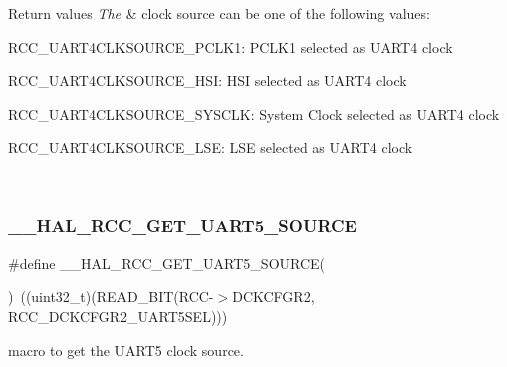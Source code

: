 \begin{DoxyRetVals}{Return values}
{\em The} & clock source can be one of the following values\+: \begin{DoxyItemize}
\item R\+C\+C\+\_\+\+U\+A\+R\+T4\+C\+L\+K\+S\+O\+U\+R\+C\+E\+\_\+\+P\+C\+L\+K1\+: P\+C\+L\+K1 selected as U\+A\+R\+T4 clock \item R\+C\+C\+\_\+\+U\+A\+R\+T4\+C\+L\+K\+S\+O\+U\+R\+C\+E\+\_\+\+H\+SI\+: H\+SI selected as U\+A\+R\+T4 clock \item R\+C\+C\+\_\+\+U\+A\+R\+T4\+C\+L\+K\+S\+O\+U\+R\+C\+E\+\_\+\+S\+Y\+S\+C\+LK\+: System Clock selected as U\+A\+R\+T4 clock \item R\+C\+C\+\_\+\+U\+A\+R\+T4\+C\+L\+K\+S\+O\+U\+R\+C\+E\+\_\+\+L\+SE\+: L\+SE selected as U\+A\+R\+T4 clock \end{DoxyItemize}
\\
\hline
\end{DoxyRetVals}
\mbox{\label{group___r_c_c_ex___exported___macros_ga8c0fc64b4ab3fbb914788d1f5731f28e}} 
\subsubsection{\texorpdfstring{\_\_HAL\_RCC\_GET\_UART5\_SOURCE}{\_\_HAL\_RCC\_GET\_UART5\_SOURCE}}
{\footnotesize\ttfamily \#define \+\_\+\+\_\+\+H\+A\+L\+\_\+\+R\+C\+C\+\_\+\+G\+E\+T\+\_\+\+U\+A\+R\+T5\+\_\+\+S\+O\+U\+R\+CE(\begin{DoxyParamCaption}{ }\end{DoxyParamCaption})~((uint32\+\_\+t)(R\+E\+A\+D\+\_\+\+B\+IT(R\+CC-\/$>$D\+C\+K\+C\+F\+G\+R2, R\+C\+C\+\_\+\+D\+C\+K\+C\+F\+G\+R2\+\_\+\+U\+A\+R\+T5\+S\+EL)))}



macro to get the U\+A\+R\+T5 clock source. 



